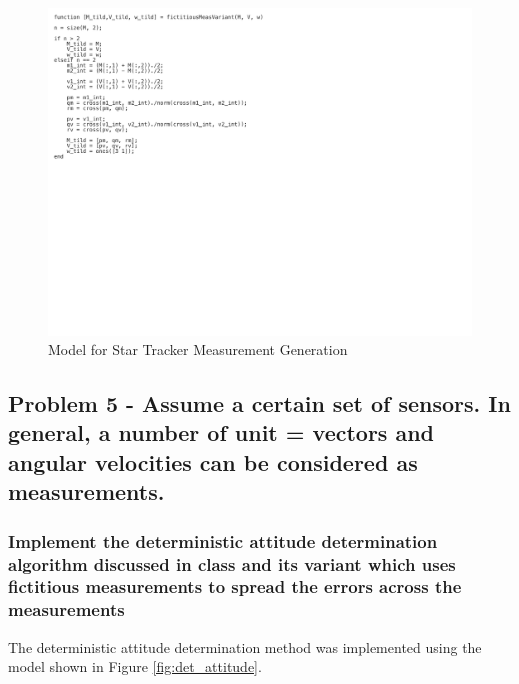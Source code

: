 \begin{figure}[H]
    \centering
    \captionsetup{ justification = centering }
    \includegraphics[trim={0cm 10cm 10cm 0cm},clip,width = 15cm]{Images/PS6/fict_meas_code.png}
    \caption{Model for Star Tracker Measurement Generation}
    \label{fig:fictitious_meas}
\end{figure}

\subsection{Problem 5 - Assume a certain set of sensors. In general, a number of unit = vectors and angular velocities can be considered as measurements.}

\subsubsection{Implement the deterministic attitude determination algorithm discussed in class and its variant which uses fictitious measurements to spread the errors across the measurements}

The deterministic attitude determination method was implemented using the model shown in Figure \ref{fig:det_attitude}.

